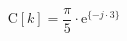 \begin{center}
\[
\textrm{C}[k] = \frac{\pi}{5} \cdot \textrm{e}^{\{ -j \cdot 3 \}}
\]
\end{center}
